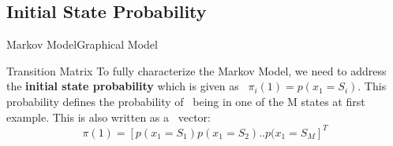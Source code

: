 \documentclass[10pt]{beamer}
\begin{document}
\subsection{Initial State Probability}
\begin{frame}{Markov Model}{Graphical Model}
  \begin{block}{Transition Matrix}
   To fully characterize the Markov Model, we need to address the 
   \textbf{initial state probability} which is given as \
   $\pi_i(1) = p(x_1 = S_i)$. This probability defines the probability of \
   being in one of the M states at first example. This is also written as a \
   vector:\\
        \begin{equation}
            \pi(1) = [p(x_1 = S_1) p(x_1 = S_2) .. p(x_1 = S_M]^T
        \end{equation}
  \end{block}
\end{frame}

\end{document}
